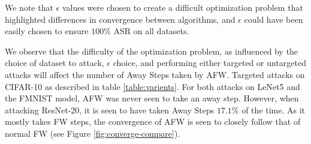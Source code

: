 \documentclass{article}
\begin{document}
\begin{table}[H]
    \centering
    \caption{Attack Success Rate (ASR) and Average Iterations of Frank-Wolfe Algorithm and Variants for Targeted Adversarial Attacks on 500 Examples from Three Datasets with $20$ maximum iterations and decaying step-size rule.}
	\label{table:varients}
\end{table}
We note that $\epsilon$ values were chosen to create a difficult optimization problem that highlighted differences in convergence between algorithms, and $\epsilon$ could have been easily chosen to ensure $100\%$ ASR on all datasets.

We observe that the difficulty of the optimization problem, as influenced by the choice of dataset to attack, $\epsilon$ choice, and performing either targeted or untargeted attacks will affect the number of Away Steps taken by AFW. Targeted attacks on CIFAR-10 as described in table \ref{table:varients}. For both attacks on LeNet5 and the FMNIST model, AFW was never seen to take an away step. However, when attacking ResNet-20, it is seen to have taken Away Steps $17.1\%$ of the time. As it mostly takes FW steps, the convergence of AFW is seen to closely follow that of normal FW (see Figure \ref{fig:converge-compare}).
\end{document}

